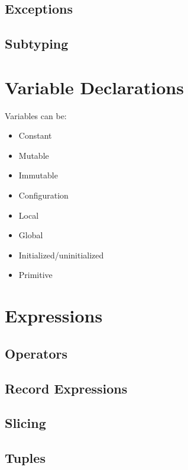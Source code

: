 \documentclass{book}
\begin{document}
\section{Exceptions}

\section{Subtyping}

\chapter{Variable Declarations}

Variables can be:
\begin{itemize}
    \item Constant
    \item Mutable
    \item Immutable
    \item Configuration
    \item Local
    \item Global
    \item Initialized/uninitialized
    \item Primitive
\end{itemize}

\chapter{Expressions}

\section{Operators}

\section{Record Expressions}

\section{Slicing}

\section{Tuples}
\end{document}
